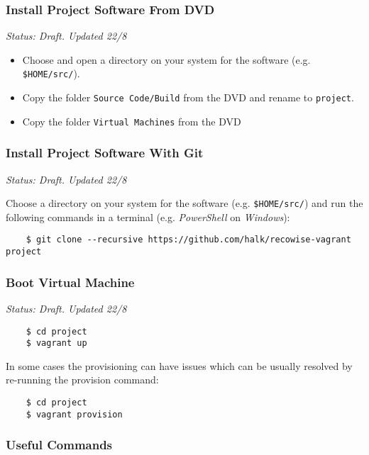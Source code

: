 \subsubsection{Install Project Software From DVD}

\emph{Status: Draft. Updated 22/8}

\begin{itemize}
\item Choose and open a directory on your system for the software (e.g. \texttt{\$HOME/src/}).
\item Copy the folder \texttt{Source Code/Build} from the DVD and rename to \texttt{project}.
\item Copy the folder \texttt{Virtual Machines} from the DVD
\end{itemize}

\subsubsection{Install Project Software With Git}

\emph{Status: Draft. Updated 22/8}

Choose a directory on your system for the software (e.g. \texttt{\$HOME/src/}) and run the following commands in a terminal (e.g. \emph{PowerShell} on \emph{Windows}):

\begin{verbatim}
    $ git clone --recursive https://github.com/halk/recowise-vagrant project
\end{verbatim}

\subsubsection{Boot Virtual Machine}

\emph{Status: Draft. Updated 22/8}

\begin{verbatim}
    $ cd project
    $ vagrant up
\end{verbatim}

In some cases the provisioning can have issues which can be usually resolved by re-running the provision command:

\begin{verbatim}
    $ cd project
    $ vagrant provision
\end{verbatim}

\subsubsection{Useful Commands}

